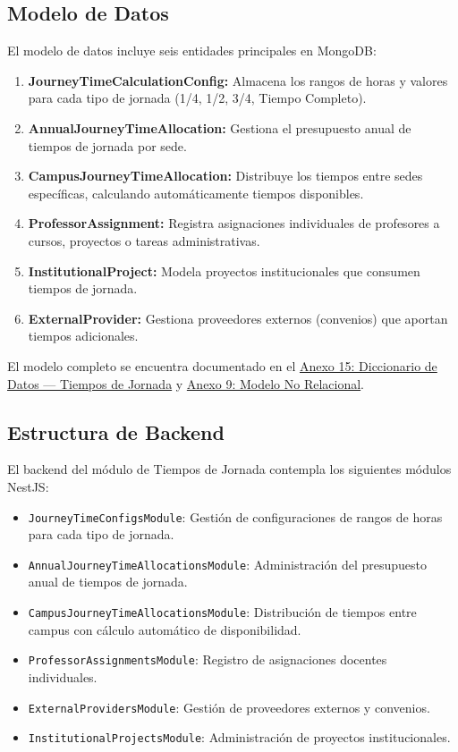 \subsection{Modelo de Datos}

El modelo de datos incluye seis entidades principales en MongoDB:

\begin{enumerate}
    \item \textbf{JourneyTimeCalculationConfig:} Almacena los rangos de horas y valores para cada tipo de jornada (1/4, 1/2, 3/4, Tiempo Completo).
    \item \textbf{AnnualJourneyTimeAllocation:} Gestiona el presupuesto anual de tiempos de jornada por sede.
    \item \textbf{CampusJourneyTimeAllocation:} Distribuye los tiempos entre sedes específicas, calculando automáticamente tiempos disponibles.
    \item \textbf{ProfessorAssignment:} Registra asignaciones individuales de profesores a cursos, proyectos o tareas administrativas.
    \item \textbf{InstitutionalProject:} Modela proyectos institucionales que consumen tiempos de jornada.
    \item \textbf{ExternalProvider:} Gestiona proveedores externos (convenios) que aportan tiempos adicionales.
\end{enumerate}

El modelo completo se encuentra documentado en el \hyperref[anexo:dicc_jornada]{Anexo 15: Diccionario de Datos --- Tiempos de Jornada} y \hyperref[anexo:modelo_no_relacional]{Anexo 9: Modelo No Relacional}.

\subsection{Estructura de Backend}

El backend del módulo de Tiempos de Jornada contempla los siguientes módulos NestJS:

\begin{itemize}
    \item \texttt{JourneyTimeConfigsModule}: Gestión de configuraciones de rangos de horas para cada tipo de jornada.
    \item \texttt{AnnualJourneyTimeAllocationsModule}: Administración del presupuesto anual de tiempos de jornada.
    \item \texttt{CampusJourneyTimeAllocationsModule}: Distribución de tiempos entre campus con cálculo automático de disponibilidad.
    \item \texttt{ProfessorAssignmentsModule}: Registro de asignaciones docentes individuales.
    \item \texttt{ExternalProvidersModule}: Gestión de proveedores externos y convenios.
    \item \texttt{InstitutionalProjectsModule}: Administración de proyectos institucionales.
\end{itemize}

